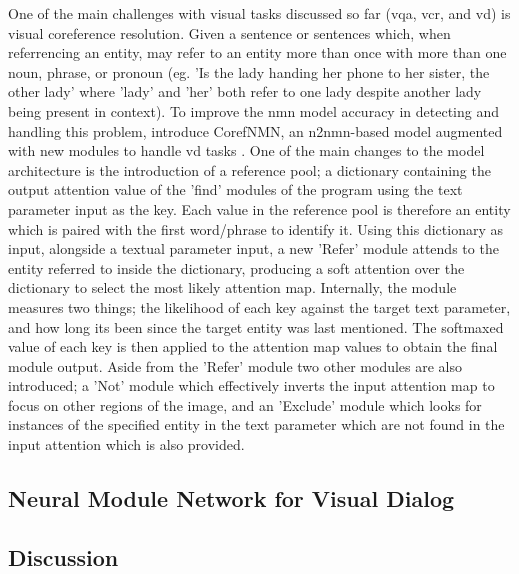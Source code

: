One of the main challenges with visual tasks discussed so far (\gls{vqa}, \gls{vcr}, and \gls{vd}) is visual coreference resolution.
Given a sentence or sentences which, when referrencing an entity, may refer to an entity more than once with more than one noun, phrase, or pronoun (eg. 'Is the lady handing her phone to her sister, the other lady' where 'lady' and 'her' both refer to one lady despite another lady being present in context).
To improve the \gls{nmn} model accuracy in detecting and handling this problem, \citeauthor{kottur_visual_2018} introduce CorefNMN, an \gls{n2nmn}-based model augmented with new modules to handle \gls{vd} tasks \cite{kottur_visual_2018}.
One of the main changes to the model architecture is the introduction of a reference pool; a dictionary containing the output attention value of the 'find' modules of the program using the text parameter input as the key.
Each value in the reference pool is therefore an entity which is paired with the first word/phrase to identify it.
Using this dictionary as input, alongside a textual parameter input, a new 'Refer' module attends to the entity referred to inside the dictionary, producing a soft attention over the dictionary to select the most likely attention map.
Internally, the module measures two things; the likelihood of each key against the target text parameter, and how long its been since the target entity was last mentioned.
The softmaxed value of each key is then applied to the attention map values to obtain the final module output.
Aside from the 'Refer' module two other modules are also introduced; a 'Not' module which effectively inverts the input attention map to focus on other regions of the image, and an 'Exclude' module which looks for instances of the specified entity in the text parameter which are not found in the input attention which is also provided.

\subsection{Neural Module Network for Visual Dialog}
\label{subsec:neural_module_network_for_visual_dialog}


\subsection{Discussion}
\label{subsec:other_compositional_models_discussion}

